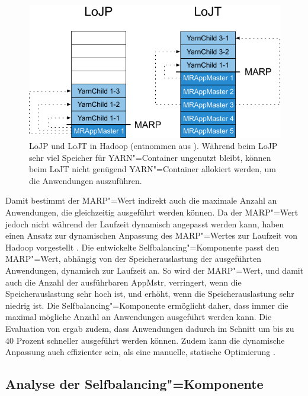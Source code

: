 \begin{figure}[h]
    \includegraphics{./resources/marpValue.pdf}
    \caption[LoJP und LoJT in Hadoop]
    {LoJP und LoJT in Hadoop (entnommen aus \cite{Zhang2016}).
        Während beim LoJP sehr viel Speicher für YARN"=Container ungenutzt bleibt, können beim LoJT nicht genügend YARN"=Container allokiert werden, um die Anwendungen auszuführen.}
    \label{fig:marpValue}
\end{figure}

Damit bestimmt der \gls{MARP}"=Wert indirekt auch die maximale Anzahl an Anwendungen, die gleichzeitig ausgeführt werden können.
Da der \gls{MARP}"=Wert jedoch nicht während der Laufzeit dynamisch angepasst werden kann, haben \citeauthor{Zhang2016} einen Ansatz zur dynamischen Anpassung des \gls{MARP}"=Wertes zur Laufzeit von Hadoop vorgestellt \cite{Zhang2016}.
Die entwickelte Selfbalancing"=Komponente passt den \gls{MARP}"=Wert, abhängig von der Speicherauslastung der ausgeführten Anwendungen, dynamisch zur Laufzeit an.
So wird der \gls{MARP}"=Wert, und damit auch die Anzahl der ausführbaren \gls{AppMstr}, verringert, wenn die Speicherauslastung sehr hoch ist, und erhöht, wenn die Speicherauslastung sehr niedrig ist.
Die Selfbalancing"=Komponente ermöglicht daher, dass immer die maximal mögliche Anzahl an Anwendungen ausgeführt werden kann.
Die Evaluation von \citeauthor{Zhang2016} ergab zudem, dass Anwendungen dadurch im Schnitt um bis zu 40 Prozent schneller ausgeführt werden können.
Zudem kann die dynamische Anpassung auch effizienter sein, als eine manuelle, statische Optimierung \cite{Zhang2016}.

\subsection{Analyse der Selfbalancing"=Komponente}
\label{subsec:selfbalancingAnalysis}

